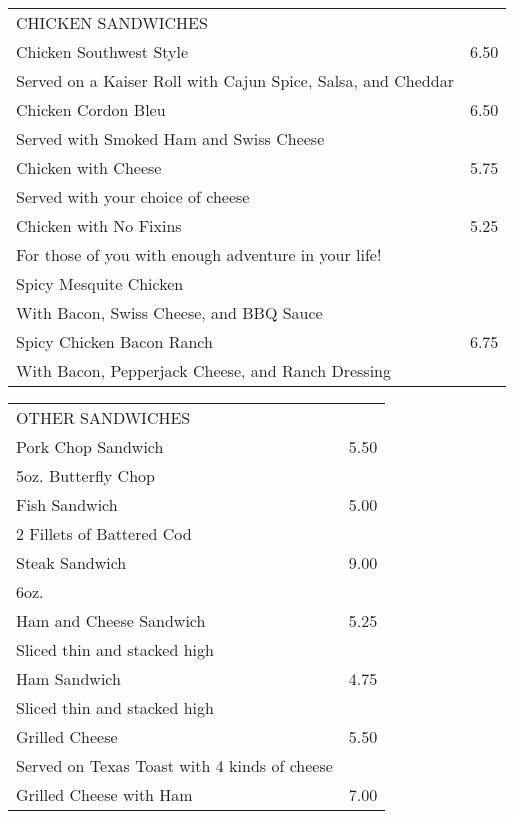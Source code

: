 \documentclass[10pt,notitlepage]{article}
\makeatletter
\newcommand*\ColText[1]{\uppercase{#1}}
\newenvironment{Group}[1]
	{\noindent\begin{tabular*}{\textwidth}{@{}p{.8\linewidth}@{\extracolsep{\fill}}r@{}}
		{\centering\fontsize{16}{20}\selectfont\ColText{#1}}\\[0.8em]\par}
	{\end{tabular*}}
\newcommand*\Item[2]{%
	\sffamily#1\dotfill & #2}
\newcommand*\Desc[1]{%
	\hspace*{1em}\footnotesize #1}
\makeatother
\begin{document}
	\vfill{}
	
	\begin{Group}{Chicken Sandwiches}
		\Item{Chicken Southwest Style}{6.50} \\
		\Desc{Served on a Kaiser Roll with Cajun Spice, Salsa, and Cheddar} \\
		\Item{Chicken Cordon Bleu}{6.50} \\
		\Desc{Served with Smoked Ham and Swiss Cheese} \\
		\Item{Chicken with Cheese}{5.75} \\
		\Desc{Served with your choice of cheese} \\
		\Item{Chicken with No Fixins}{5.25} \\
		\Desc{For those of you with enough adventure in your life!} \\
		\Item{Spicy Mesquite Chicken} \\
		\Desc{With Bacon, Swiss Cheese, and BBQ Sauce} \\
		\Item{Spicy Chicken Bacon Ranch}{6.75} \\
		\Desc{With Bacon, Pepperjack Cheese, and Ranch Dressing} \\
	\end{Group}
	
	\vfill{}
	
	\begin{Group}{Other Sandwiches}
		\Item{Pork Chop Sandwich}{5.50} \\
		\Desc{5oz. Butterfly Chop} \\
		\Item{Fish Sandwich}{5.00} \\
		\Desc{2 Fillets of Battered Cod} \\
		\Item{Steak Sandwich}{9.00} \\
		\Desc{6oz.} \\
		\Item{Ham and Cheese Sandwich}{5.25} \\
		\Desc{Sliced thin and stacked high} \\
		\Item{Ham Sandwich}{4.75} \\
		\Desc{Sliced thin and stacked high} \\
		\Item{Grilled Cheese}{5.50} \\
		\Desc{Served on Texas Toast with 4 kinds of cheese} \\
		\Item{Grilled Cheese with Ham}{7.00} \\
	\end{Group}
	
	\vfill{}
	
\end{document}
